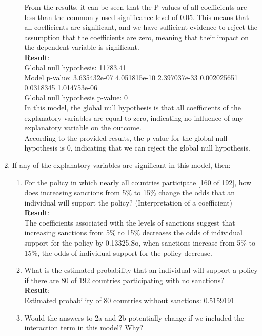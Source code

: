 \documentclass[12pt,letterpaper]{article}
\begin{document}
\begin{enumerate}
\begin{enumerate}
		From the results, it can be seen that the P-values of all coefficients are less than the commonly used significance level of 0.05. This means that all coefficients are significant, and we have sufficient evidence to reject the assumption that the coefficients are zero, meaning that their impact on the dependent variable is significant.\\
		 
		\textbf{Result}:\\
		Global null hypothesis: 11783.41 \\
		Model p-value: 3.635432e-07 4.051815e-10 2.397037e-33 0.002025651 0.0318345 1.014753e-06 \\
		Global null hypothesis p-value: 0 \\
		In this model, the global null hypothesis is that all coefficients of the explanatory variables are equal to zero, indicating no influence of any explanatory variable on the outcome.\\
		According to the provided results, the p-value for the global null hypothesis is 0, indicating that we can reject the global null hypothesis.
		
	\end{enumerate}
	
	\item
	If any of the explanatory variables are significant in this model, then:
	\begin{enumerate}
		\item
		For the policy in which nearly all countries participate [160 of 192], how does increasing sanctions from 5\% to 15\% change the odds that an individual will support the policy? (Interpretation of a coefficient)\\
		\textbf{Result}:\\
		The coefficients associated with the levels of sanctions suggest that increasing sanctions from 5\% to 15\% decreases the odds of individual support for the policy by 0.13325.So, when sanctions increase from 5\% to 15\%, the odds of individual support for the policy decrease.
		\item
		What is the estimated probability that an individual will support a policy if there are 80 of 192 countries participating with no sanctions? \\
		 
		\textbf{Result}:\\
		Estimated probability of 80 countries without sanctions: 0.5159191 \\
		\item
		Would the answers to 2a and 2b potentially change if we included the interaction term in this model? Why? \\
		

\end{enumerate}
\end{enumerate}
\end{document}
